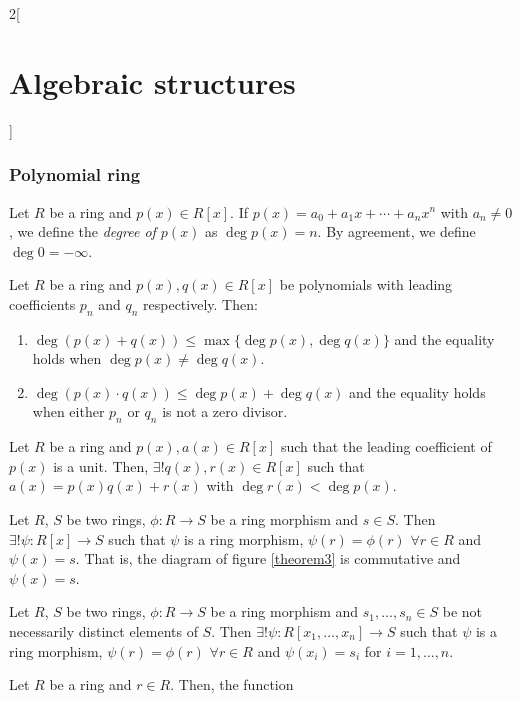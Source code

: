 \documentclass[../../../main.tex]{subfiles}
\begin{document}
\begin{multicols}{2}[\section{Algebraic structures}]
\subsubsection{Polynomial ring}
\begin{definition}
    Let $R$ be a ring and $p(x)\in R[x]$. If $p(x)=a_0+a_1x+\cdots+a_nx^n$ with $a_n\ne 0$, we define the \textit{degree of $p(x)$} as $\deg p(x)=n$. By agreement, we define $\deg 0=-\infty$.
\end{definition}
\begin{prop}\label{AG-deg}
    Let $R$ be a ring and $p(x),q(x)\in R[x]$ be polynomials with leading coefficients $p_n$ and $q_n$ respectively. Then:
    \begin{enumerate}
        \item $\deg(p(x)+q(x))\leq\max\{\deg p(x),\deg q(x)\}$ and the equality holds when $\deg p(x)\ne\deg q(x)$.
        \item $\deg(p(x)\cdot q(x))\leq\deg p(x)+\deg q(x)$ and the equality holds when either $p_n$ or $q_n$ is not a zero divisor.
    \end{enumerate}
\end{prop}
\begin{prop}
    Let $R$ be a ring and $p(x),a(x)\in R[x]$ such that the leading coefficient of $p(x)$ is a unit. Then, $\exists! q(x),r(x)\in R[x]$ such that $a(x)=p(x)q(x)+r(x)$ with $\deg r(x)<\deg p(x)$.
\end{prop}
\begin{prop}
    Let $R$, $S$ be two rings, $\phi:R\rightarrow S$ be a ring morphism and $s\in S$. Then $\exists!\psi:R[x]\rightarrow S$ such that $\psi$ is a ring morphism, $\psi(r)=\phi(r)$ $\forall r\in R$ and $\psi(x)=s$. That is, the diagram of figure \ref{theorem3} is commutative and $\psi(x)=s$.
\end{prop}
\begin{prop}
    Let $R$, $S$ be two rings, $\phi:R\rightarrow S$ be a ring morphism and $s_1,\ldots,s_n\in S$ be not necessarily distinct elements of $S$. Then $\exists!\psi:R[x_1,\ldots,x_n]\rightarrow S$ such that $\psi$ is a ring morphism, $\psi(r)=\phi(r)$ $\forall r\in R$ and $\psi(x_i)=s_i$ for $i=1,\ldots,n$.
\end{prop}
\begin{corollary}
    Let $R$ be a ring and $r\in R$. Then, the function 
    \begin{align*}

\end{align*}
\end{corollary}
\end{multicols}
\end{document}
